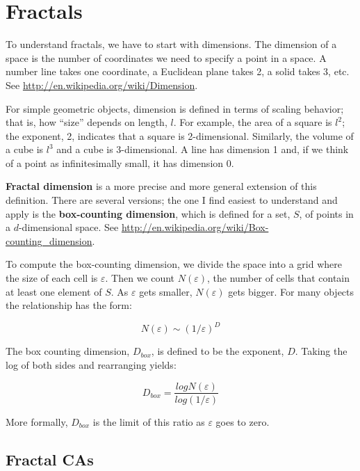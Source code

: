\documentclass[10pt]{book}
\begin{document}
\chapter{Fractals}
\label{fractals}

To understand fractals, we have to start with dimensions.  The
dimension of a space is the number of coordinates we need to specify a
point in a space.  A number line takes one coordinate, a Euclidean
plane takes 2, a solid takes 3, etc.  See
\url{http://en.wikipedia.org/wiki/Dimension}.

For simple geometric objects, dimension is defined in terms of scaling
behavior; that is, how ``size'' depends on length, $l$.  For example,
the area of a square is $l^2$; the exponent, 2, indicates that a
square is 2-dimensional.  Similarly, the volume of a cube is $l^3$ and
a cube is 3-dimensional.  A line has dimension 1 and, if we think of a
point as infinitesimally small, it has dimension 0.

{\bf Fractal dimension} is a more precise and more general extension
of this definition.  There are several versions; the one I find
easiest to understand and apply is the {\bf box-counting dimension},
which is defined for a set, $S$, of points in a $d$-dimensional
space.  See \url{http://en.wikipedia.org/wiki/Box-counting_dimension}.

\newcommand{\veps}{\varepsilon}

To compute the box-counting dimension, we divide the space into a grid
where the size of each cell is $\veps$.  Then we count $N(\veps)$,
the number of cells that contain at least one element of $S$.  As
$\veps$ gets smaller, $N(\veps)$ gets bigger.  For many objects
the relationship has the form:

\[ N(\veps) \sim \left( 1 / \veps \right)^D \]

The box counting dimension, $D_{box}$, is defined to be the exponent, $D$.
Taking the log of both sides and rearranging yields:

\[ D_{box} = \frac{log N(\veps)}{log \left( 1 / \veps \right)} \]

More formally, $D_{box}$ is the limit of this ratio as $\veps$ goes
to zero.


\section{Fractal CAs}
\end{document}
